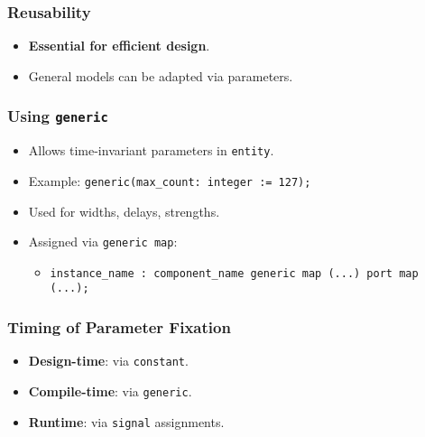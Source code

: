 \subsubsection{Reusability}
\begin{itemize}[leftmargin=1.5em]
    \item \textbf{Essential for efficient design}.
    \item General models can be adapted via parameters.
\end{itemize}

\subsubsection{Using \texttt{generic}}
\begin{itemize}[leftmargin=1.5em]
    \item Allows time-invariant parameters in \texttt{entity}.
    \item Example: \verb|generic(max_count: integer := 127);|
    \item Used for widths, delays, strengths.
    \item Assigned via \texttt{generic map}:
    \begin{itemize}
        \item \verb|instance_name : component_name generic map (...) port map (...);|
    \end{itemize}
\end{itemize}

\subsubsection{Timing of Parameter Fixation}
\begin{itemize}[leftmargin=1.5em]
    \item \textbf{Design-time}: via \texttt{constant}.
    \item \textbf{Compile-time}: via \texttt{generic}.
    \item \textbf{Runtime}: via \texttt{signal} assignments.
\end{itemize}
